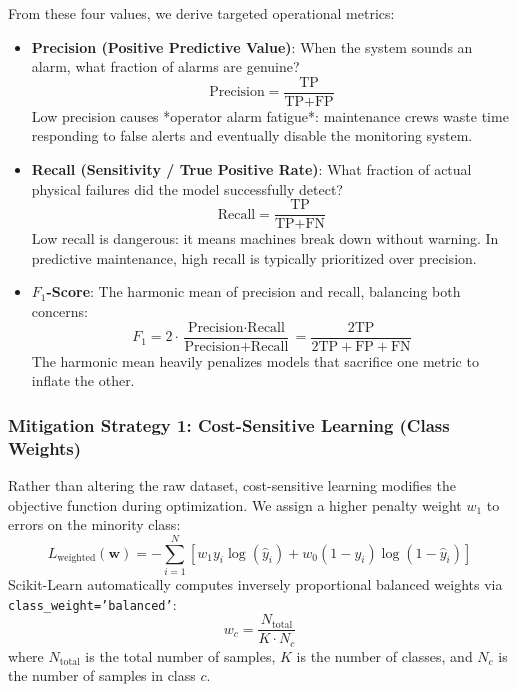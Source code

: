 From these four values, we derive targeted operational metrics:
\begin{itemize}
    \item \textbf{Precision (Positive Predictive Value)}: When the system sounds an alarm, what fraction of alarms are genuine?
    \begin{equation}
    \text{Precision} = \frac{\text{TP}}{\text{TP} + \text{FP}}\label{eq:precision_def}
    \end{equation}
    Low precision causes *operator alarm fatigue*: maintenance crews waste time responding to false alerts and eventually disable the monitoring system.

    \item \textbf{Recall (Sensitivity / True Positive Rate)}: What fraction of actual physical failures did the model successfully detect?
    \begin{equation}
    \text{Recall} = \frac{\text{TP}}{\text{TP} + \text{FN}}\label{eq:recall_def}
    \end{equation}
    Low recall is dangerous: it means machines break down without warning. In predictive maintenance, high recall is typically prioritized over precision.

    \item \textbf{$F_1$-Score}: The harmonic mean of precision and recall, balancing both concerns:
    \begin{equation}
    F_1 = 2 \cdot \frac{\text{Precision} \cdot \text{Recall}}{\text{Precision} + \text{Recall}} = \frac{2\text{TP}}{2\text{TP} + \text{FP} + \text{FN}}\label{eq:f1_score_def}
    \end{equation}
    The harmonic mean heavily penalizes models that sacrifice one metric to inflate the other.
\end{itemize}

\subsubsection{Mitigation Strategy 1: Cost-Sensitive Learning (Class Weights)}
Rather than altering the raw dataset, cost-sensitive learning modifies the objective function during optimization. We assign a higher penalty weight $w_1$ to errors on the minority class:
\begin{equation}
L_{\text{weighted}}(\mathbf{w}) = - \sum_{i=1}^{N} \left[ w_1 y_i \log(\hat{y}_i) + w_0 (1 - y_i) \log(1 - \hat{y}_i) \right]\label{eq:weighted_log_loss}
\end{equation}
Scikit-Learn automatically computes inversely proportional balanced weights via \texttt{class\_weight='balanced'}:
\begin{equation}
w_c = \frac{N_{\text{total}}}{K \cdot N_c}\label{eq:balanced_class_weight}
\end{equation}
where $N_{\text{total}}$ is the total number of samples, $K$ is the number of classes, and $N_c$ is the number of samples in class $c$.

